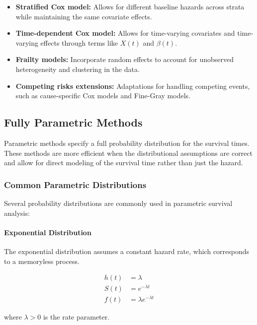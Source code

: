 \begin{itemize}
    \item \textbf{Stratified Cox model:} Allows for different baseline hazards across strata while maintaining the same covariate effects.
    
    \item \textbf{Time-dependent Cox model:} Allows for time-varying covariates and time-varying effects through terms like $X(t)$ and $\beta(t)$.
    
    \item \textbf{Frailty models:} Incorporate random effects to account for unobserved heterogeneity and clustering in the data.
    
    \item \textbf{Competing risks extensions:} Adaptations for handling competing events, such as cause-specific Cox models and Fine-Gray models.
\end{itemize}

\subsection{Fully Parametric Methods}

Parametric methods specify a full probability distribution for the survival times. These methods are more efficient when the distributional assumptions are correct and allow for direct modeling of the survival time rather than just the hazard.

\subsubsection{Common Parametric Distributions}

Several probability distributions are commonly used in parametric survival analysis:

\paragraph{Exponential Distribution}
The exponential distribution assumes a constant hazard rate, which corresponds to a memoryless process.

\begin{equationbox}[title=Exponential Distribution]
\begin{align}
h(t) &= \lambda\\
S(t) &= e^{-\lambda t}\\
f(t) &= \lambda e^{-\lambda t}
\end{align}

where $\lambda > 0$ is the rate parameter.
\end{equationbox}

